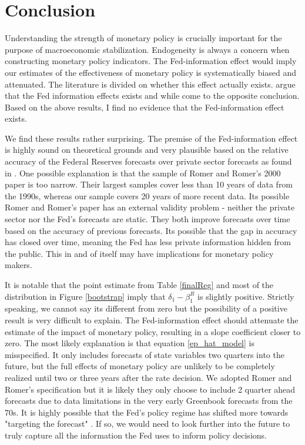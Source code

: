\documentclass[a4paper,man,floatsintext,natbib]{apa6}
\begin{document}
	\section{Conclusion} 
		Understanding the strength of monetary policy is crucially important for the purpose of macroeconomic stabilization. Endogeneity is always a concern when constructing monetary policy indicators. The Fed-information effect would imply our estimates of the effectiveness of monetary policy is systematically biased and attenuated. The literature is divided on whether this effect actually exists. \cite{Nakamura2018} argue that the Fed information effects exists and while \cite{Bauer2020} come to the opposite conclusion. Based on the above results, I find no evidence that the Fed-information effect exists.
		
		We find these results rather surprising. The premise of the Fed-information effect is highly sound on theoretical grounds and very plausible based on the relative accuracy of the Federal Reserves forecasts over private sector forecasts as found in \cite{Romer2000}. One possible explanation is that the sample of Romer and Romer's 2000 paper is too narrow. Their largest samples cover less than 10 years of data from the 1990s, whereas our sample covers 20 years of more recent data. Its possible Romer and Romer's paper has an external validity problem - neither the private sector nor the Fed's forecasts are static. They both improve forecasts over time based on the accuracy of previous forecasts. Its possible that the gap in accuracy has closed over time, meaning the Fed has less private information hidden from the public. This in and of itself may have implications for monetary policy makers.
		
		It is notable that the point estimate from Table \ref{finalReg} and most of the distribution in Figure \ref{bootstrap} imply that \(\delta_1 - \beta_1^R\) is slightly positive. Strictly speaking, we cannot say its different from zero but the possibility of a positive result is very difficult to explain. The Fed-information effect should attenuate the estimate of the impact of monetary policy, resulting in a slope coefficient closer to zero. The most likely explanation is that equation \ref{ep_hat_model} is misspecified. It only includes forecasts of state variables two quarters into the future, but the full effects of monetary policy are unlikely to be completely realized until two or three years after the rate decision. We adopted Romer and Romer's specification but it is likely they only choose to include 2 quarter ahead forecasts due to data limitations in the very early Greenbook forecasts from the 70s. It is highly possible that the Fed's policy regime has shifted more towards "targeting the forecast" \citep{Svensson2020}. If so, we would need to look further into the future to truly capture all the information the Fed uses to inform policy decisions. 
		
\end{document}
